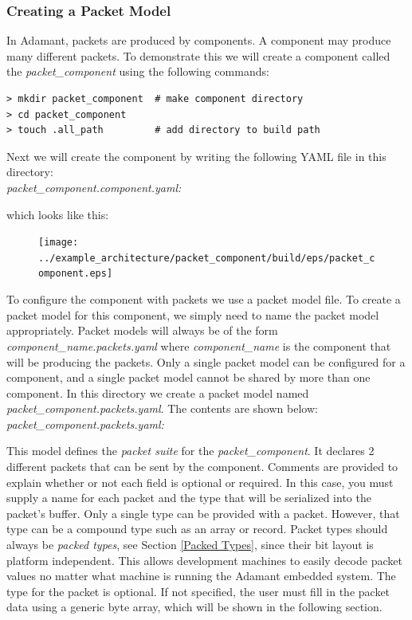\subsubsection{Creating a Packet Model}

In Adamant, packets are produced by components. A component may produce many different packets. To demonstrate this we will create a component called the \textit{packet\_component} using the following commands:

\vspace{5mm} %
\begin{verbatim}
> mkdir packet_component  # make component directory
> cd packet_component 
> touch .all_path         # add directory to build path
\end{verbatim}
\vspace{5mm} %

Next we will create the component by writing the following YAML file in this directory: \\

\textit{packet\_component.component.yaml:}

which looks like this:

\begin{figure}[H]
  \texttt{[image: ../example\_architecture/packet\_component/build/eps/packet\_component.eps]}
\end{figure}

To configure the component with packets we use a packet model file. To create a packet model for this component, we simply need to name the packet model appropriately. Packet models will always be of the form \textit{component\_name.packets.yaml} where \textit{component\_name} is the component that will be producing the packets. Only a single packet model can be configured for a component, and a single packet model cannot be shared by more than one component. In this directory we create a packet model named \textit{packet\_component.packets.yaml}. The contents are shown below: \\

\textit{packet\_component.packets.yaml:}

This model defines the \textit{packet suite} for the \textit{packet\_component}. It declares 2 different packets that can be sent by the component. Comments are provided to explain whether or not each field is optional or required. In this case, you must supply a name for each packet and the type that will be serialized into the packet's buffer. Only a single type can be provided with a packet. However, that type can be a compound type such as an array or record. Packet types should always be \textit{packed types}, see Section \ref{Packed Types}, since their bit layout is platform independent. This allows development machines to easily decode packet values no matter what machine is running the Adamant embedded system. The type for the packet is optional. If not specified, the user must fill in the packet data using a generic byte array, which will be shown in the following section. \\

